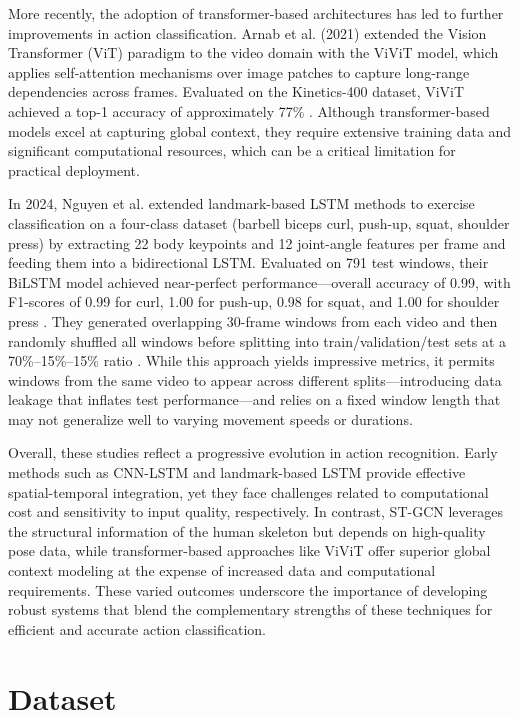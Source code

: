 \documentclass[journal,onecolumn, 11pt]{IEEEtran}
\begin{document}
More recently, the adoption of transformer-based architectures has led to further improvements in action classification. Arnab et al. (2021) extended the Vision Transformer (ViT) paradigm to the video domain with the ViViT model, which applies self-attention mechanisms over image patches to capture long-range dependencies across frames. Evaluated on the Kinetics-400 dataset, ViViT achieved a top-1 accuracy of approximately 77\% \cite{arnab2021}. Although transformer-based models excel at capturing global context, they require extensive training data and significant computational resources, which can be a critical limitation for practical deployment.

In 2024, Nguyen et al. extended landmark-based LSTM methods to exercise classification on a four-class dataset (barbell biceps curl, push-up, squat, shoulder press) by extracting 22 body keypoints and 12 joint-angle features per frame and feeding them into a bidirectional LSTM. Evaluated on 791 test windows, their BiLSTM model achieved near-perfect performance—overall accuracy of 0.99, with F1-scores of 0.99 for curl, 1.00 for push-up, 0.98 for squat, and 1.00 for shoulder press . They generated overlapping 30-frame windows from each video and then randomly shuffled all windows before splitting into train/validation/test sets at a 70\%–15\%–15\% ratio . While this approach yields impressive metrics, it permits windows from the same video to appear across different splits—introducing data leakage that inflates test performance—and relies on a fixed window length that may not generalize well to varying movement speeds or durations.  \cite{riccio2024}

Overall, these studies reflect a progressive evolution in action recognition. Early methods such as CNN-LSTM and landmark-based LSTM provide effective spatial-temporal integration, yet they face challenges related to computational cost and sensitivity to input quality, respectively. In contrast, ST-GCN leverages the structural information of the human skeleton but depends on high-quality pose data, while transformer-based approaches like ViViT offer superior global context modeling at the expense of increased data and computational requirements. These varied outcomes underscore the importance of developing robust systems that blend the complementary strengths of these techniques for efficient and accurate action classification.



\section{Dataset}
\end{document}
